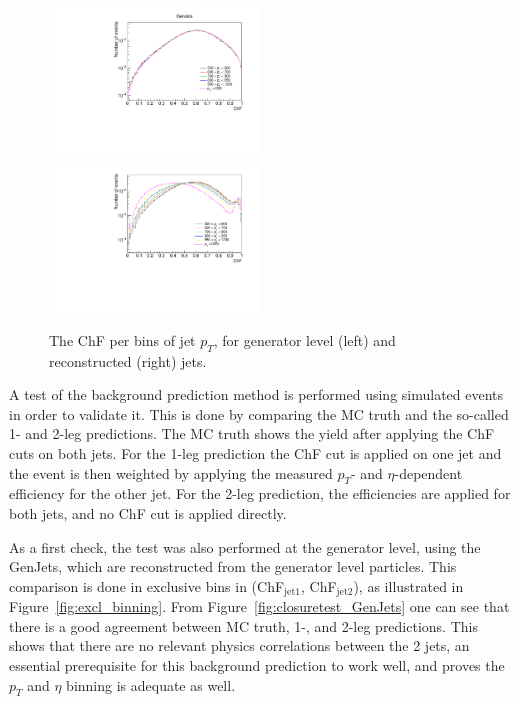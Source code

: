 \begin{figure}[ht]
  \centering
  \includegraphics[width=0.5\textwidth]{figures/ChFPerPtbin_GenJets.pdf}\hfill%
  \includegraphics[width=0.5\textwidth]{figures/ChFperPtbin.pdf}
  \caption{The ChF per bins of jet $p_T$, for generator level (left) and reconstructed (right) jets.}
  \label{fig:pt_dependence}
\end{figure}

A test of the background prediction method is performed using simulated events in order to validate it. This is done by comparing the MC truth and the so-called 1- and 2-leg predictions. The MC truth shows the yield after applying the ChF cuts on both jets. For the 1-leg prediction the ChF cut is applied on one jet and the event is then weighted by applying the measured $p_T$- and $\eta$-dependent efficiency for the other jet. For the 2-leg prediction, the efficiencies are applied for both jets, and no ChF cut is applied directly.

As a first check, the test was also performed at the generator level, using the GenJets, which are reconstructed from the generator level particles. This comparison is done in exclusive bins in (ChF$_{\mathrm{jet 1}}$, ChF$_{\mathrm{jet 2}}$), as illustrated in Figure~\ref{fig:excl_binning}. From Figure~\ref{fig:closuretest_GenJets} one can see that there is a good agreement between MC truth, 1-, and 2-leg predictions. This shows that there are no relevant physics correlations between the 2 jets, an essential prerequisite for this background prediction to work well, and proves the $p_T$ and $\eta$ binning is adequate as well.

